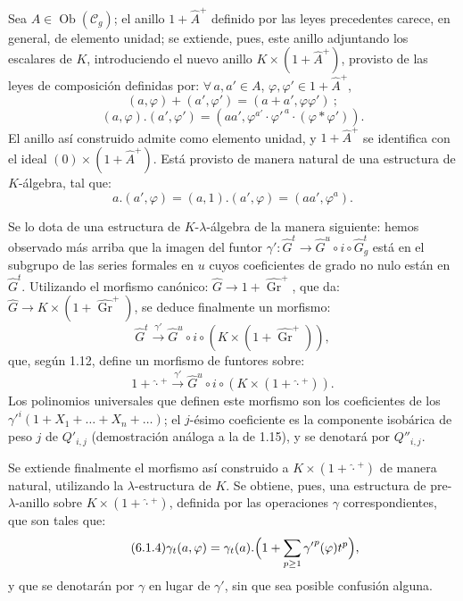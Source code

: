 Sea \(A\in\operatorname{Ob}(\mathcal C_g)\); el anillo \(1+\widehat A^{+}\) definido por las leyes precedentes carece, en general, de elemento unidad; se extiende, pues, este anillo adjuntando los escalares de \(K\), introduciendo el nuevo anillo \(K\times(1+\widehat A^{+})\), provisto de las leyes de composición definidas por: \(\forall\,a,a'\in A\), \(\varphi,\varphi'\in1+\widehat A^{+}\),
\[
  (a,\varphi)+(a',\varphi')=(a+a',\varphi\varphi')~;
\]
\begin{equation}\tag{6.1.2}
  (a,\varphi).(a',\varphi')=(aa',\varphi^{a'}\cdot{\varphi'}^{\,a}\cdot(\varphi\ast\varphi')).
\end{equation}
El anillo así construido admite  como elemento unidad, y \(1+\widehat A^{+}\) se identifica con el ideal \((0)\times(1+\widehat A^{+})\). Está provisto de manera natural de una estructura de \(K\)-álgebra, tal que:
\begin{equation}\tag{6.1.3}
  a.(a',\varphi)=(a,1).(a',\varphi)=(aa',\varphi^{a}).
\end{equation}

Se lo dota de una estructura de \(K\)-\(\lambda\)-álgebra de la manera siguiente: hemos observado más arriba que la imagen del funtor \(\gamma'\colon\widehat G^t\longrightarrow\widehat G^u\circ i\circ\widehat G^t_g\) está en el subgrupo de las series formales en \(u\) cuyos coeficientes de grado no nulo están en \(\widehat G^t\). Utilizando el morfismo canónico: \(\widehat G\longrightarrow 1+\widehat{\operatorname{Gr}}^{+}\), que da: \(\widehat G\longrightarrow K\times(1+\widehat{\operatorname{Gr}}^{+})\), se deduce finalmente un morfismo:
\[
  \widehat G^t\xrightarrow{\gamma'}\widehat G^u\circ i\circ(K\times(1+\widehat{\operatorname{Gr}}^{+})),
\]
que, según 1.12, define un morfismo de funtores sobre\qquad:
\[
  1+\widehat{\cdot}{}^{+}\xrightarrow{\gamma'}\widehat G^u\circ i\circ(K\times(1+\widehat{\cdot}{}^{+})).
\]
Los polinomios universales que definen este morfismo son los coeficientes de los \({\gamma'}^{i}(1+X_1+\dots+X_n+\dots)\); el \(j\)-ésimo coeficiente es la componente isobárica de peso \(j\) de \(Q'_{i,j}\) (demostración análoga a la de 1.15), y se denotará por \(Q''_{i,j}\).

Se extiende finalmente el morfismo así construido a \(K\times(1+\widehat{\cdot}{}^{+})\) de manera natural, utilizando la \(\lambda\)-estructura de \(K\). Se obtiene, pues, una estructura de pre-\(\lambda\)-anillo sobre \(K\times(1+\widehat{\cdot}{}^{+})\), definida por las operaciones \(\gamma\) correspondientes, que son tales que:
\begin{equation}\tag{6.1.4}
  \gamma_t(a,\varphi)=\gamma_t(a).\Bigl(1+\sum_{p\ge1}{\gamma'}^{p}(\varphi)t^{p}\Bigr),
\end{equation}
y que se denotarán por \(\gamma\) en lugar de \(\gamma'\), sin que sea posible confusión alguna.

